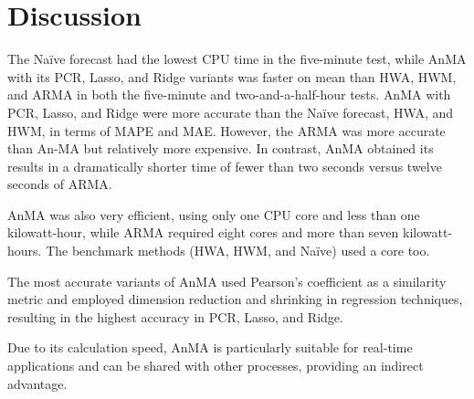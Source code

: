 \documentclass[journal, twoside]{IEEEtran}
\begin{document}




\section{Discussion}
\label{sec:Discussion}
The Naïve forecast had the lowest CPU time in the five-minute test, while \ac{AnMA} with its \ac{PCR}, Lasso, and Ridge variants was faster on mean than \ac{HWA}, \ac{HWM}, and \ac{ARMA} in both the five-minute and two-and-a-half-hour tests.
\ac{AnMA} with \ac{PCR}, Lasso, and Ridge were more accurate than the Naïve forecast, \ac{HWA}, and \ac{HWM}, in terms of \ac{MAPE} and \ac{MAE}. However, the \ac{ARMA} was more accurate than An-MA but relatively more expensive.
In contrast, \ac{AnMA} obtained its results in a dramatically shorter time of fewer than two seconds versus twelve seconds of \ac{ARMA}. 

\ac{AnMA} was also very efficient, using only one CPU core and less than one kilowatt-hour, while \ac{ARMA} required eight cores and more than seven kilowatt-hours. The benchmark methods (\ac{HWA}, \ac{HWM}, and Naïve) used a core too.

The most accurate variants of \ac{AnMA} used Pearson's coefficient as a similarity metric and employed dimension reduction and shrinking in regression techniques, resulting in the highest accuracy in \ac{PCR}, Lasso, and Ridge.

Due to its calculation speed, \ac{AnMA} is particularly suitable for real-time applications and can be shared with other processes, providing an indirect advantage. 
\end{document}
